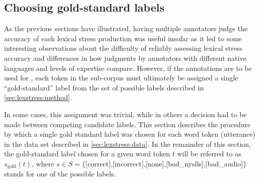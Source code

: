 %				
			
			
			
		\subsection{Choosing gold-standard labels}
		\label{sec:agreement:gold}
		
		
		As the previous sections have illustrated, having multiple annotators judge the accuracy of each lexical stress production was useful insofar as it led to some interesting observations about the difficulty of reliably assessing lexical stress accuracy and differences in how judgments by annotators with different native languages and levels of expertise compare. However, if the annotations are to be used for , each token in the sub-corpus must ultimately be assigned a single ``gold-standard'' label from the set of possible labels described in \cref{sec:lexstress:method}.
		
		In some cases, this assignment was trivial, while in others a decision had to be made between competing candidate labels. This section describes the procedure by which a single gold standard label was chosen for each word token (utterance) in the data set described in \cref{sec:lexstress:data}. In the remainder of this section, the gold-standard label chosen for a given word token $t$ will be referred to as $s_{\text{gold}}(t)$, where $s \in S = \{$[correct],{[incorrect]},{[none]},{[bad\_nyslls]},{[bad\_audio]}$\}$ stands for one of the possible labels.
		
